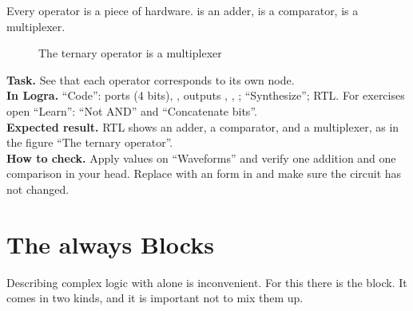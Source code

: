 Every operator is a piece of hardware.  is an adder,
 is a comparator,  is a multiplexer.

\begin{figure}[H]
\centering
{}
\caption{The ternary operator  is a multiplexer}
\end{figure}

\begin{diybox}
\textbf{Task.} See that each operator corresponds to its own node.\\
\textbf{In Logra.} ``Code'': ports  (4 bits), , outputs , , ; ``Synthesize''; RTL. For exercises open ``Learn'': ``Not AND'' and ``Concatenate bits''.\\
\textbf{Expected result.} RTL shows an adder, a comparator, and a multiplexer, as in the figure ``The ternary operator''.\\
\textbf{How to check.} Apply values on ``Waveforms'' and verify one addition and one comparison in your head.  Replace  with an  form in  and make sure the circuit has not changed.
\end{diybox}

\section{The always Blocks}
\label{sec:always}

Describing complex logic with  alone is inconvenient. For this there is the
 block. It comes in two kinds, and it is important not to mix them up.

